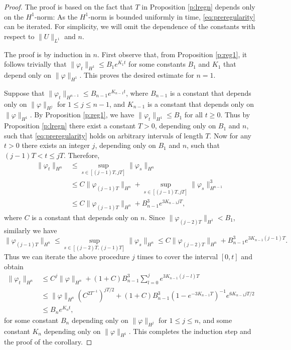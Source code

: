 \documentclass[11pt,a4paper,draft,DIV11]{scrartcl}	%
\begin{document}
\begin{proof}
The proof is based on the fact that $T$ in Proposition \ref{p:lregn} depends only on the $H^1$-norm: As the $H^1$-norm is bounded uniformly in time, \eqref{eq:preregularity} can be iterated. 
  For simplicity, we will omit the dependence of the constants with respect
  to $\| U \|_{L^1}$ and $n$.

  The proof is by induction in $n$. First observe that, from Proposition
  \ref{p:reg1}, it follows trivially that $\| \varphi_t \|_{H^1} \le B_1
  e^{K_1 t}$ for some constants $B_1$ and $K_1$ that depend only on $\|
  \varphi \|_{H^1}$. This proves the desired estimate for $n=1$.

  Suppose that $\| \varphi_t \|_{H^{n-1}} \le B_{n-1} e^{K_{n-1} t}$, where
  $B_{n-1}$ is a constant that depends only on $\| \varphi \|_{H^j}$ for $1
  \le j \le n-1$, and $K_{n-1}$ is a constant that depends only on $\|
  \varphi \|_{H^1}$. By Proposition \ref{p:reg1}, we have $\| \varphi_t
  \|_{H^1} \le B_1$ for all $t \ge 0$.
%
 Thus by Proposition \ref{p:lregn} there exist a constant $T>0$, depending 
  only on $B_1$ and $n$, such that \eqref{eq:preregularity} holds on arbitrary intervals of length $T$. Now for
 any $t > 0$ there exists an integer $j$, depending
  only on $B_1$ and $n$, such that $(j-1)T < t \le jT$. Therefore,
%
  \begin{align*}
    \| \varphi_t \|_{H^n} & \le \sup_{s \in [(j-1)T, jT]} \| \varphi_s
    \|_{H^n} \\
    & \le C \| \varphi_{(j-1)T} \|_{H^n} + \sup_{s \in [(j-1)T, jT]} \|
    \varphi_s \|_{H^{n-1}}^3 \\
    & \le C \| \varphi_{(j-1)T} \|_{H^n} + B_{n-1}^3 e^{3 K_{n-1} j T},
  \end{align*}
  where $C$ is a constant that depends only on $n$. Since $\|
  \varphi_{(j-2)T} \|_{H^1} < B_1$, similarly we have
  \[
    \| \varphi_{(j-1)T} \|_{H^n} \le \sup_{s \in [(j-2)T, (j-1)T]} \|
    \varphi_s \|_{H^n} \le C \|
    \varphi_{(j-2)T} \|_{H^n} + B_{n-1}^3 e^{3 K_{n-1} (j-1)T}.
  \]
  Thus we can iterate the above procedure $j$ times to cover the interval
  $[0,t]$ and obtain
  \begin{align*}
    \| \varphi_t \|_{H^n} & \le C^j \| \varphi \|_{H^n} + (1+C) B_{n-1}^3
    \sum_{l=0}^j e^{3 K_{n-1} (j-l)T} \\
    & \le \| \varphi \|_{H^n} (C^{2 T^{-1}})^{jT/2} + (1+C) B_{n-1}^3
    (1-e^{-3K_{n-1} T})^{-1} e^{6 K_{n-1} jT/2} \\
    & \le B_n e^{K_n t},
  \end{align*}
  for some constant $B_n$ depending only on $\| \varphi \|_{H^j}$ for $1 \le
  j \le n$, and some constant $K_n$ depending only on $\| \varphi \|_{H^1}$.
  This completes the induction step and the proof of the corollary.
\end{proof}
\end{document}
